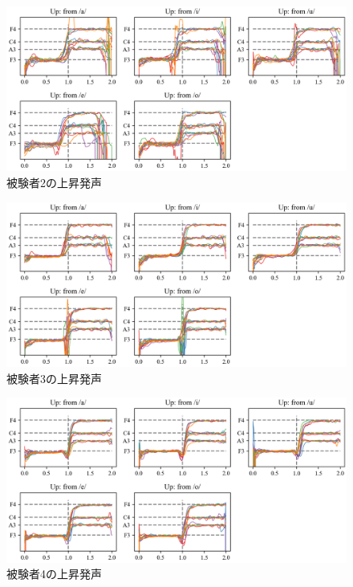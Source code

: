 \documentclass[10ptj,a4j,dvipdfmx,uplatex, oneside, openany]{jsbook}%
\begin{document}
\begin{figure}[htbp]
    \begin{center}
      \includegraphics[clip,width=16.0cm]{F0_up_2.png}
      \caption{被験者2の上昇発声}
      \label{fig:u2}
    \end{center}
\end{figure}

\begin{figure}[htbp]
    \begin{center}
      \includegraphics[clip,width=16.0cm]{F0_up_3.png}
      \caption{被験者3の上昇発声}
      \label{fig:u3}
    \end{center}

\end{figure}\begin{figure}[htbp]
    \begin{center}
      \includegraphics[clip,width=16.0cm]{F0_up_4.png}
      \caption{被験者4の上昇発声}
      \label{fig:u4}
    \end{center}
\end{figure}
\end{document}
